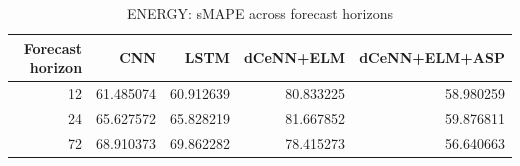 \begin{table}
\caption{ENERGY: sMAPE across forecast horizons}
\begin{tabular}{rrrrr}
\toprule
Forecast horizon & CNN & LSTM & dCeNN+ELM & dCeNN+ELM+ASP \\
\midrule
12 & 61.485074 & 60.912639 & 80.833225 & 58.980259 \\
24 & 65.627572 & 65.828219 & 81.667852 & 59.876811 \\
72 & 68.910373 & 69.862282 & 78.415273 & 56.640663 \\
\bottomrule
\end{tabular}
\end{table}
